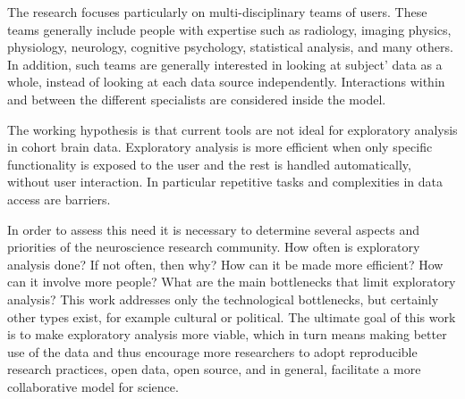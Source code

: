 The research focuses particularly on multi-disciplinary teams of users. These teams generally include people with expertise such as radiology, imaging physics, physiology, neurology, cognitive psychology, statistical analysis, and many others. In addition, such teams are generally interested in looking at subject' data as a whole, instead of looking at each data source independently. Interactions within and between the different specialists are considered inside the model. 

The working hypothesis is that  current tools are not ideal for exploratory analysis in cohort brain data. Exploratory analysis is more efficient when only specific functionality is exposed to the user and the rest is handled automatically, without user interaction. In particular repetitive tasks and complexities in data access are barriers. 

In order to assess this need it is necessary to determine several aspects and priorities of the neuroscience research community. How often is exploratory analysis done? If not often, then why? How can it be made more efficient? How can it involve more people? What are the main bottlenecks that limit exploratory analysis? This work addresses only the technological bottlenecks, but certainly other types exist, for example cultural or political. The ultimate goal of this work is to make exploratory analysis more viable, which in turn means making better use of the data and thus encourage more researchers to adopt reproducible research practices, open data, open source, and in general, facilitate a more collaborative model for science.









